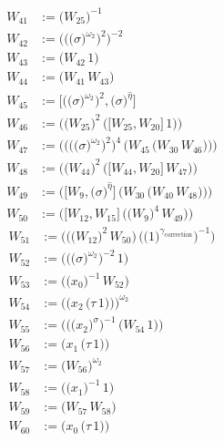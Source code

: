 \begin{align*}
W_{41} &:= \bigl(W_{25}\bigr)^{-1} \\
W_{42} &:= \bigl(\bigl(\bigl(\sigma\bigr)^{\omega_2}\bigr)^{2}\bigr)^{-2} \\
W_{43} &:= \bigl(W_{42}\,1\bigr) \\
W_{44} &:= \bigl(W_{41}\,W_{43}\bigr) \\
W_{45} &:= \bigl[\bigl(\bigl(\sigma\bigr)^{\omega_2}\bigr)^{2},\bigl(\sigma\bigr)^{\widehat{\eta}}\bigr] \\
W_{46} &:= \bigl(\bigl(W_{25}\bigr)^{2}\,\bigl(\bigl[W_{25},W_{20}\bigr]\,1\bigr)\bigr) \\
W_{47} &:= \bigl(\bigl(\bigl(\bigl(\sigma\bigr)^{\omega_2}\bigr)^{2}\bigr)^{4}\,\bigl(W_{45}\,\bigl(W_{30}\,W_{46}\bigr)\bigr)\bigr) \\
W_{48} &:= \bigl(\bigl(W_{44}\bigr)^{2}\,\bigl(\bigl[W_{44},W_{20}\bigr]\,W_{47}\bigr)\bigr) \\
W_{49} &:= \bigl(\bigl[W_{9},\bigl(\sigma\bigr)^{\widehat{\eta}}\bigr]\,\bigl(W_{30}\,\bigl(W_{40}\,W_{48}\bigr)\bigr)\bigr) \\
W_{50} &:= \bigl(\bigl[W_{12},W_{15}\bigr]\,\bigl(\bigl(W_{9}\bigr)^{4}\,W_{49}\bigr)\bigr)
\end{align*}
\begin{align*}
W_{51} &:= \bigl(\bigl(\bigl(W_{12}\bigr)^{2}\,W_{50}\bigr)\,\bigl(\bigl(1\bigr)^{\gamma_{\mathrm{correction}}}\bigr)^{-1}\bigr) \\
W_{52} &:= \bigl(\bigl(\bigl(\sigma\bigr)^{\omega_2}\bigr)^{-2}\,1\bigr) \\
W_{53} &:= \bigl(\bigl(x_{0}\bigr)^{-1}\,W_{52}\bigr) \\
W_{54} &:= \bigl(\bigl(x_{2}\,\bigl(\tau\,1\bigr)\bigr)\bigr)^{\omega_2} \\
W_{55} &:= \bigl(\bigl(\bigl(x_{2}\bigr)^{\sigma}\bigr)^{-1}\,\bigl(W_{54}\,1\bigr)\bigr) \\
W_{56} &:= \bigl(x_{1}\,\bigl(\tau\,1\bigr)\bigr) \\
W_{57} &:= \bigl(W_{56}\bigr)^{\omega_2} \\
W_{58} &:= \bigl(\bigl(x_{1}\bigr)^{-1}\,1\bigr) \\
W_{59} &:= \bigl(W_{57}\,W_{58}\bigr) \\
W_{60} &:= \bigl(x_{0}\,\bigl(\tau\,1\bigr)\bigr)
\end{align*}

